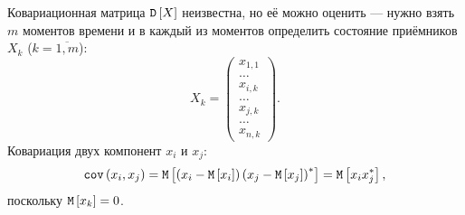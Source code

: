 Ковариационная матрица $\mathtt{D} \left [ X \right ]$ неизвестна, но её можно оценить --- нужно взять $m$ моментов времени и в каждый из моментов определить состояние приёмников $X_k$
($k = \overline{1,m}$):
\[
    X_k =
    \begin{pmatrix}
        x_{1,1} \\
        \dots   \\
        x_{i,k} \\
        \dots   \\
        x_{j,k} \\
        \dots   \\
        x_{n,k}
    \end{pmatrix} .
\]
Ковариация двух компонент $x_i$ и $x_j$:
\[
    \mathtt{cov} \left ( x_i, x_j \right )
    = \mathtt{M} \left [ \left ( x_i - \mathtt{M} \left [ x_i \right ] \right ) \left ( x_j - \mathtt{M} \left [ x_j \right ] \right )^* \right ]
    = \mathtt{M} \left [  x_i x_j^* \right ],
\]
поскольку $\mathtt{M} \left [ x_k \right ] = 0$.

